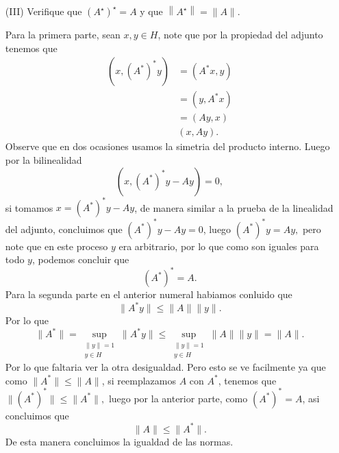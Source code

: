 \begin{itemize}
\begin{sproof}
\end{sproof}
\item[(III)] Verifique que $\left(A^{\star}\right)^{\star}=A$ y que $\left\|A^{\star}\right\|=\|A\|$.
\begin{sproof}
    Para la primera parte, sean $x,y\in H$, note que por la propiedad del adjunto tenemos que
    \begin{align*}
         (x,(A^*)^*y)&=(A^*x,y)\\
         &=(y,A^*x)\\
         &=(Ay,x)\\
         &(x,Ay).
     \end{align*}
     Observe que en dos ocasiones usamos la simetria del producto interno. Luego por la bilinealidad
     $$(x,(A^*)^*y-Ay)=0,$$
     si tomamos $x=(A^*)^*y-Ay$, de manera similar a la prueba de la linealidad del adjunto, concluimos que $(A^*)^*y-Ay=0$, luego $(A^*)^*y=Ay,$ pero note que en este proceso $y$ era arbitrario, por lo que como son iguales para todo $y$, podemos concluir que
     $$(A^*)^*=A.$$
     Para la segunda parte en el anterior numeral habiamos conluido que
     $$\|A^*y\|\leq \|A\|\|y\|.$$
     Por lo que
     $$\|A^*\|=\sup_{\substack{\|y\|=1\\y\in H}}\|A^*y\|\leq \sup_{\substack{\|y\|=1\\y\in H}}\|A\|\|y\|=\|A\|.$$
     Por lo que faltaria ver la otra desigualdad. Pero esto se ve facilmente ya que como $\|A^*\|\leq \|A\|$, si reemplazamos $A$ con $A^*$, tenemos que $\|(A^*)^*\|\leq \|A^*\|,$ luego por la anterior parte, como $(A^*)^*=A$, asi concluimos que
     $$\|A\|\leq \|A^*\|.$$ 
     De esta manera concluimos la igualdad de las normas.
\end{sproof}
\end{itemize}